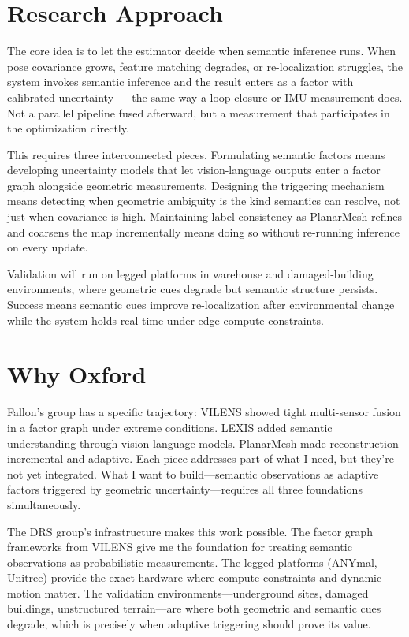 \documentclass[11pt,a4paper]{article}
\begin{document}
\section*{Research Approach}

The core idea is to let the estimator decide when semantic inference 
runs. When pose covariance grows, feature matching degrades, or 
re-localization struggles, the system invokes semantic inference and 
the result enters as a factor with calibrated uncertainty — the same 
way a loop closure or IMU measurement does. Not a parallel pipeline 
fused afterward, but a measurement that participates in the 
optimization directly.

This requires three interconnected pieces. Formulating semantic 
factors means developing uncertainty models that let vision-language 
outputs enter a factor graph alongside geometric measurements. 
Designing the triggering mechanism means detecting when geometric 
ambiguity is the kind semantics can resolve, not just when covariance 
is high. Maintaining label consistency as PlanarMesh 
refines and coarsens the map incrementally means doing so 
without re-running inference on every update.

Validation will run on legged platforms in warehouse and 
damaged-building environments, where geometric cues degrade but 
semantic structure persists. Success means semantic cues improve 
re-localization after environmental change while the system 
holds real-time under edge compute constraints.

\section*{Why Oxford}

Fallon's group has a specific trajectory: VILENS \cite{wisth2022vilens} showed tight multi-sensor fusion in a factor graph under extreme conditions. LEXIS \cite{kassab2024lexis} added semantic understanding through vision-language models. PlanarMesh \cite{wang2025planarmesh} made reconstruction incremental and adaptive. Each piece addresses part of what I need, but they're not yet integrated. What I want to build—semantic observations as adaptive factors triggered by geometric uncertainty—requires all three foundations simultaneously.

The DRS group's infrastructure makes this work possible. The factor graph frameworks from VILENS give me the foundation for treating semantic observations as probabilistic measurements. The legged platforms (ANYmal, Unitree) provide the exact hardware where compute constraints and dynamic motion matter. The validation environments—underground sites, damaged buildings, unstructured terrain—are where both geometric and semantic cues degrade, which is precisely when adaptive triggering should prove its value.
\end{document}
